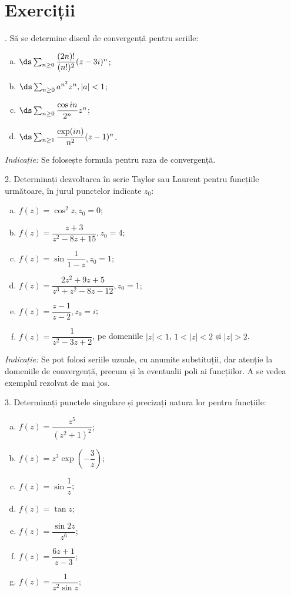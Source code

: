 \section{Exerciții}

\indent{}. Să se determine discul de convergență pentru seriile:
\begin{enumerate}[(a)]
\item $ \ds\sum_{n \geq 0} \dfrac{(2n)!}{(n!)^2} (z - 3i)^n $;
\item $ \ds\sum_{n \geq 0} a^{n^2}z^n, |a| < 1 $;
\item $ \ds\sum_{n \geq 0} \dfrac{\cos in}{2^n} z^n $;
\item $ \ds\sum_{n \geq 1} \dfrac{\exp(in)}{n^2} (z - 1)^n $.
\end{enumerate}

\emph{Indicație:} Se folosește formula pentru raza de convergență.

\vspace{0.3cm}

2. Determinați dezvoltarea în serie Taylor sau Laurent pentru funcțiile următoare,
în jurul punctelor indicate $ z_0 $:
\begin{enumerate}[(a)]
\item $ f(z) = \cos^2 z, z_0 = 0 $;
\item $ f(z) = \dfrac{z + 3}{z^2 - 8z + 15}, z_0 = 4 $;
\item $ f(z) = \sin \dfrac{1}{1 - z}, z_0 = 1 $;
\item $ f(z) = \dfrac{2z^2 + 9z + 5}{z^3 + z^2 - 8z - 12}, z_0 = 1 $;
\item $ f(z) = \dfrac{z - 1}{z - 2}, z_0 = i $;
\item $ f(z) = \dfrac{1}{z^2 - 3z + 2} $, pe domeniile $ |z| < 1 $,
  $ 1 < |z| < 2 $ și $ |z| > 2 $.
\end{enumerate}

\emph{Indicație:} Se pot folosi seriile uzuale, cu anumite substituții,
dar atenție la domeniile de convergență, precum și la eventualii poli ai
funcțiilor. A se vedea exemplul rezolvat de mai jos.

\vspace{0.3cm}

3. Determinați punctele singulare și precizați natura lor pentru funcțiile:
\begin{enumerate}[(a)]
\item $ f(z) = \dfrac{z^5}{(z^2 + 1)^2} $;
\item $ f(z) = z^3 \exp\left( -\dfrac{3}{z} \right) $;
\item $ f(z) = \sin \dfrac{1}{z} $;
\item $ f(z) = \tan z $;
\item $ f(z) = \dfrac{\sin 2z}{z^6} $;
\item $ f(z) = \dfrac{6z + 1}{z - 3} $;
\item $ f(z) = \dfrac{1}{z^2 \sin z} $;
\end{enumerate}

